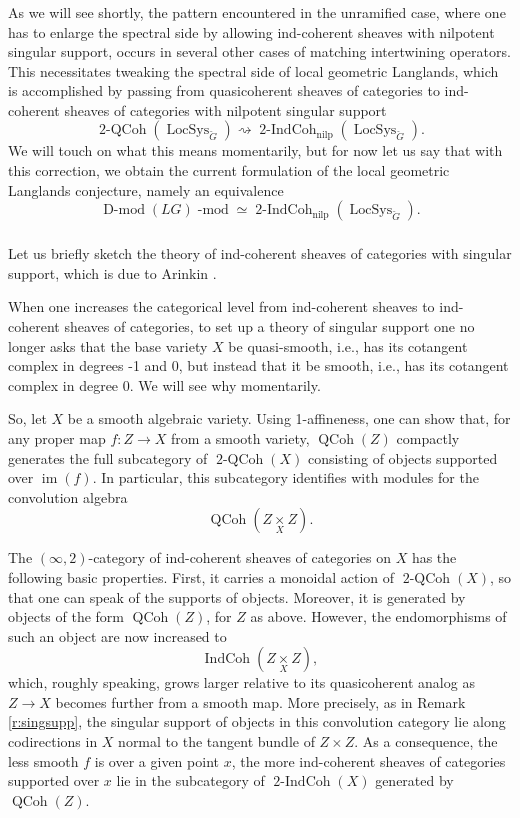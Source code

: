 \documentclass[10pt]{amsart}
\newcommand{\IC}{\on{IndCoh}}
\newcommand{\TwoCoh}{\on{2-QCoh}}
\newcommand{\TwoIC}{\on{2-IndCoh}_{\on{nilp}}}
\newcommand{\LS}{\on{LocSys}_{\cG}}
\newcommand{\on}{\operatorname}
\renewcommand{\mod}{\on{-mod}}
\newcommand{\Dmod}{\on{D-mod}}
\theoremstyle{remark}
\numberwithin{equation}{section}
\newcommand{\cG}{\check{G}}
\renewcommand{\mod}{\operatorname{-mod}}
\newcommand{\QCoh}{\on{QCoh}}
\begin{document}
\subsubsection{} As  we will see shortly, the pattern encountered in the 
unramified case, where one has to enlarge the spectral side by allowing 
ind-coherent sheaves with nilpotent singular support, occurs in several other 
cases of matching intertwining operators. This necessitates tweaking the 
spectral side of local geometric Langlands, which is accomplished by passing from quasicoherent 
sheaves of categories to ind-coherent sheaves of categories with nilpotent 
singular support
%
\[
\TwoCoh(\LS) \rightsquigarrow \TwoIC(\LS).
\]
%
We will touch on what this means momentarily, but for now let us say that with 
this correction, we obtain the current formulation of the local geometric 
Langlands conjecture, namely an equivalence
%
\begin{equation}
\label{e:loclang}\Dmod(LG)\mod \simeq \TwoIC(\LS). 
\end{equation}
%

\subsubsection{} Let us briefly sketch the theory of ind-coherent sheaves of 
categories with singular support, which is due to Arinkin \cite{arinkinindcohcats}. 

When one increases the categorical level from ind-coherent sheaves to 
ind-coherent sheaves of categories, to set up a theory of singular support one no longer asks that the base variety $X$ be quasi-smooth, i.e., has
its cotangent complex in degrees -1 and 0, but instead that it be smooth, i.e., 
has its cotangent complex in degree 0. We will see why momentarily. 

So, let $X$ be a smooth algebraic variety. Using 1-affineness, one can show 
that, for any proper map $f: Z \rightarrow X$ from a smooth variety, $\QCoh(Z)$ 
compactly generates the full subcategory of $\TwoCoh(X)$ consisting of objects supported over 
$\on{im}(f)$. In particular, this subcategory identifies with modules for the 
convolution algebra 
%
\[
  \QCoh(Z \underset X \times Z).
\]
%


The $(\infty,2)$-category of ind-coherent sheaves of categories on $X$ has the 
following basic properties. First, it carries a monoidal action of 
$\TwoCoh(X)$, so that one can speak of the supports of objects.  Moreover, it is
generated by objects of the form $\QCoh(Z)$, for $Z$ as above. However, the 
endomorphisms of such an object are now increased to
\[
   \IC( Z \underset{X}{\times} Z), 
\] 
%
which, roughly speaking, grows larger relative to its quasicoherent analog as $Z \rightarrow X$ becomes further from a 
smooth map. More precisely, as in Remark \ref{r:singsupp}, the singular support 
of objects in this convolution category lie along codirections in $X$ 
normal to the tangent bundle of $Z \times Z$.  As a consequence, the less 
smooth $f$ is over a given point $x$, the more ind-coherent sheaves of 
categories supported over $x$ lie in the subcategory of $\on{2-IndCoh}(X)$ 
generated by $\QCoh(Z)$. 
\end{document}
